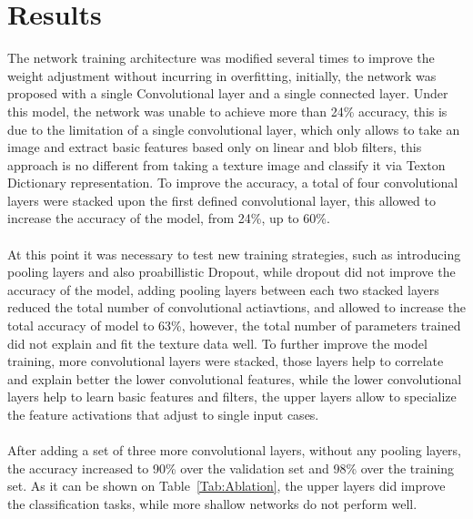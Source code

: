 \documentclass[10pt,twocolumn,letterpaper]{article}
\begin{document}


\section{Results}
The network training architecture was modified several times to improve the weight adjustment without incurring in overfitting, initially, the network was proposed with a single Convolutional layer and a single connected layer. Under this model, the network was unable to achieve more than 24\% accuracy, this is due to the limitation of a single convolutional layer, which only allows to take an image and extract basic features based only on linear and blob filters, this approach is no different from taking a texture image and classify it via Texton Dictionary representation. To improve the accuracy, a total of four convolutional layers were stacked upon the first defined convolutional layer, this allowed to increase the accuracy of the model, from 24\%, up to 60\%. 
\\
\\
At this point it was necessary to test new training strategies, such as introducing pooling layers and also proabillistic Dropout, while dropout did not improve the accuracy of the model, adding pooling layers between each two stacked layers reduced the total number of convolutional actiavtions, and allowed to increase the total accuracy of model to 63\%, however, the total number of parameters trained did not explain and fit the texture data well. To further improve the model training, more convolutional layers were stacked, those layers help to correlate and explain better the lower convolutional features, while the lower convolutional layers help to learn basic features and filters, the upper layers allow to specialize the feature activations that adjust to single input cases.
\\
\\
After adding a set of three more convolutional layers, without any pooling layers, the accuracy increased to 90\% over the validation set and 98\% over the training set. As it can be shown on Table~\ref{Tab:Ablation}, the upper layers did improve the classification tasks, while more shallow networks do not perform well.
\end{document}
